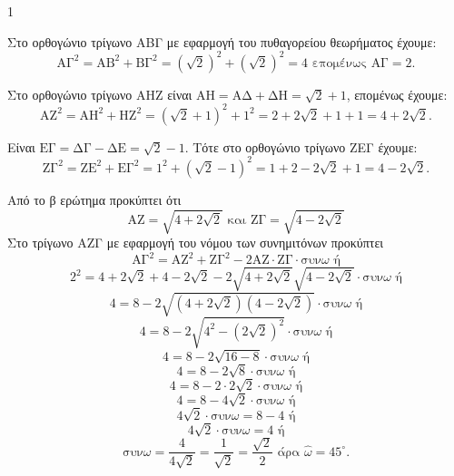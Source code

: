 \begin{ylh}{1}
    \item [Λύση από εικόνα]
\end{ylh}


\begin{alist}
    \item Στο ορθογώνιο τρίγωνο ΑΒΓ με εφαρμογή του πυθαγορείου θεωρήματος έχουμε:
    \[
        \text{ΑΓ}^2 = \text{ΑΒ}^2 + \text{ΒΓ}^2 = \left(\sqrt{2}\right)^2 + \left(\sqrt{2}\right)^2 = 4 \text{ επομένως } \text{ΑΓ} = 2.
    \]
    \item
    \begin{rlist}
        \item Στο ορθογώνιο τρίγωνο ΑΗΖ είναι $\text{ΑΗ} = \text{ΑΔ} + \text{ΔΗ} = \sqrt{2} + 1$, επομένως έχουμε:
        \[
            \text{ΑΖ}^2 = \text{ΑΗ}^2 + \text{ΗΖ}^2 = \left(\sqrt{2} + 1\right)^2 + 1^2 = 2 + 2\sqrt{2} + 1 + 1 = 4 + 2\sqrt{2}.
        \]
        \item Είναι $\text{ΕΓ} = \text{ΔΓ} - \text{ΔΕ} = \sqrt{2} - 1$. Τότε στο ορθογώνιο τρίγωνο ΖΕΓ έχουμε:
        \[
            \text{ΖΓ}^2 = \text{ΖΕ}^2 + \text{ΕΓ}^2 = 1^2 + \left(\sqrt{2} - 1\right)^2 = 1 + 2 - 2\sqrt{2} + 1 = 4 - 2\sqrt{2}.
        \]
    \end{rlist}
    \item Από το β ερώτημα προκύπτει ότι
    \[
        \text{ΑΖ} = \sqrt{4 + 2\sqrt{2}} \text{ και } \text{ΖΓ} = \sqrt{4 - 2\sqrt{2}}
    \]
    Στο τρίγωνο ΑΖΓ με εφαρμογή του νόμου των συνημιτόνων προκύπτει
    \[
        \text{ΑΓ}^2 = \text{ΑΖ}^2 + \text{ΖΓ}^2 - 2\text{ΑΖ} \cdot \text{ΖΓ} \cdot \text{συν}\omega \text{ ή}
    \]
    \[
        2^2 = 4 + 2\sqrt{2} + 4 - 2\sqrt{2} - 2\sqrt{4 + 2\sqrt{2}}\sqrt{4 - 2\sqrt{2}} \cdot \text{συν}\omega \text{ ή}
    \]
    \[
        4 = 8 - 2\sqrt{\left(4 + 2\sqrt{2}\right)\left(4 - 2\sqrt{2}\right)} \cdot \text{συν}\omega \text{ ή}
    \]
    \[
        4 = 8 - 2\sqrt{4^2 - \left(2\sqrt{2}\right)^2} \cdot \text{συν}\omega \text{ ή}
    \]
    \[
        4 = 8 - 2\sqrt{16 - 8} \cdot \text{συν}\omega \text{ ή}
    \]
    \[
        4 = 8 - 2\sqrt{8} \cdot \text{συν}\omega \text{ ή}
    \]
    \[
        4 = 8 - 2 \cdot 2\sqrt{2} \cdot \text{συν}\omega \text{ ή}
    \]
    \[
        4 = 8 - 4\sqrt{2} \cdot \text{συν}\omega \text{ ή}
    \]
    \[
        4\sqrt{2} \cdot \text{συν}\omega = 8 - 4 \text{ ή}
    \]
    \[
        4\sqrt{2} \cdot \text{συν}\omega = 4 \text{ ή}
    \]
    \[
        \text{συν}\omega = \frac{4}{4\sqrt{2}} = \frac{1}{\sqrt{2}} = \frac{\sqrt{2}}{2} \text{ άρα } \hat{\omega} = 45^\circ.
    \]
\end{alist}